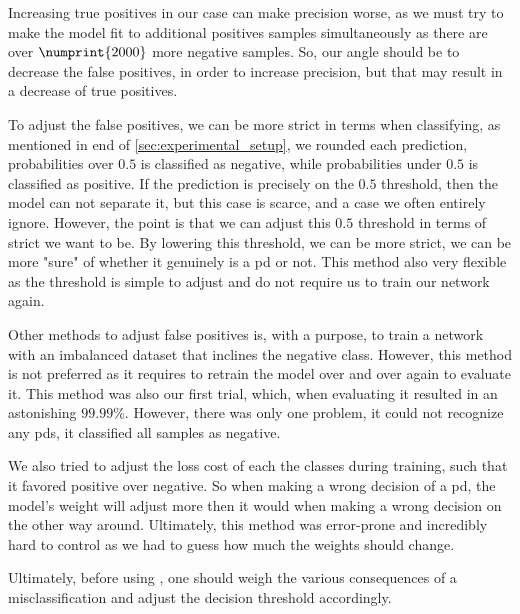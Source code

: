Increasing true positives in our case can make precision worse, as we must try to make the model fit to additional positives samples simultaneously as there are over $\numprint{2000}$ more negative samples. So, our angle should be to decrease the false positives, in order to increase precision, but that may result in a decrease of true positives. 

To adjust the false positives, we can be more strict in terms when classifying, as mentioned in end of \autoref{sec:experimental_setup}, we rounded each prediction, probabilities over $0.5$ is classified as negative, while probabilities under $0.5$ is classified as positive. If the prediction is precisely on the $0.5$ threshold, then the model can not separate it, but this case is scarce, and a case we often entirely ignore. However, the point is that we can adjust this $0.5$ threshold in terms of strict we want to be. By lowering this threshold, we can be more strict, we can be more "sure" of whether it genuinely is a \ac{pd} or not. This method also very flexible as the threshold is simple to adjust and do not require us to train our network again.

Other methods to adjust false positives is, with a purpose, to train a network with an imbalanced dataset that inclines the negative class. However, this method is not preferred as it requires to retrain the model over and over again to evaluate it. This method was also our first trial, which, when evaluating it resulted in an astonishing $99.99\%$. However, there was only one problem, it could not recognize any \acp{pd}, it classified all samples as negative.

We also tried to adjust the loss cost of each the classes during training, such that it favored positive over negative. So when making a wrong decision of a \ac{pd}, the model's weight will adjust more then it would when making a wrong decision on the other way around. Ultimately, this method was error-prone and incredibly hard to control as we had to guess how much the weights should change.

Ultimately, before using \project, one should weigh the various consequences of a misclassification and adjust the decision threshold accordingly. 